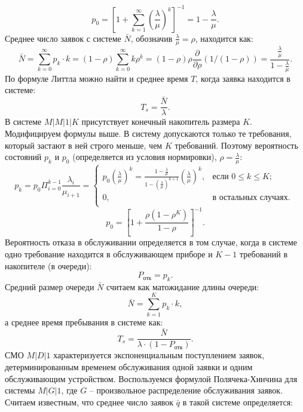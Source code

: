 \documentclass[a4paper,12 pt]{article}
\begin{document}
\begin{equation}
p_0 = [1 + \sum^{\infty}_{k = 1} (\frac{\lambda}{\mu})^k]^{-1} = 1 - \frac{\lambda}{\mu}.
\end{equation}
Среднее число заявок с системе $\bar{N}$, обозначив $\frac{\lambda}{\mu} = \rho$, находится как:
\begin{equation}
	\bar{N} = \sum^{\infty}_{k = 0}p_k \cdot k = (1-\rho) \sum^{\infty}_{k = 0} k\rho^k = (1-\rho)\rho\frac{\partial}{\partial\rho}(1/(1-\rho)) =  \frac{\frac{\lambda}{\mu}}{1-\frac{\lambda}{\mu}}.
\end{equation}
По формуле Литтла можно найти и среднее время $T$, когда заявка находится в системе:
\begin{equation}
T_s = \frac{\bar{N}}{\lambda}.
\end{equation}
В системе $M|M|1|K$ присутствует конечный накопитель размера $K$. Модифицируем формулы выше. В систему допускаются только те требования, который застают в ней строго меньше, чем $K$ требований. Поэтому вероятность состояний $p_k$ и $p_0$ (определяется из условия нормировки), $\rho = \frac{\lambda}{\mu}$:
\begin{equation}
p_k =  p_0 \Pi^{k - 1}_{i = 0}\frac{\lambda_i}{\mu_{i+1}} = 	\begin{cases} p_0(\frac{\lambda}{\mu})^{k} = \frac{1 - \frac{\lambda}{\mu}}{1-(\frac{\lambda}{\mu})^{k + 1}}(\frac{\lambda}{\mu})^k,  & \text{если } 0 \le k \le K; \\
0, & \text{в остальных случаях. } \\
	\end{cases}
\end{equation}
\begin{equation}
	p_0 = [1 + \frac{\rho(1-\rho^K)}{1-\rho}]^{-1}.
\end{equation}
Вероятность  отказа в обслуживании определяется в том случае, когда в системе одно требование находится в обслуживающем приборе и $K-1$ требований в накопителе (в очереди):
\begin{equation}
	P_{\text{отк}} = p_k.
\end{equation}
Средний размер очереди $\bar{N}$ считаем как матожидание длины очереди:
\begin{equation}
	\bar{N} = \sum^{K}_{k = 1}p_k \cdot k,
\end{equation} 
а среднее время пребывания в системе как:
\begin{equation}
	T_s = \frac{\bar{N}}{\lambda \cdot (1 - P_{\text{отк}})}.
\end{equation}
СМО $M|D|1$ характеризуется экспоненциальным поступлением заявок, детерминированным временем обслуживания одной заявки и одним обслуживающим устройством. Воспользуемся формулой Полячека-Хинчина для системы $M|G|1$, где $G$ -- произвольное распределение обслуживания заявок. Считаем известным, что среднее число заявок $\bar{q}$ в такой системе определяется: 
\end{document}
